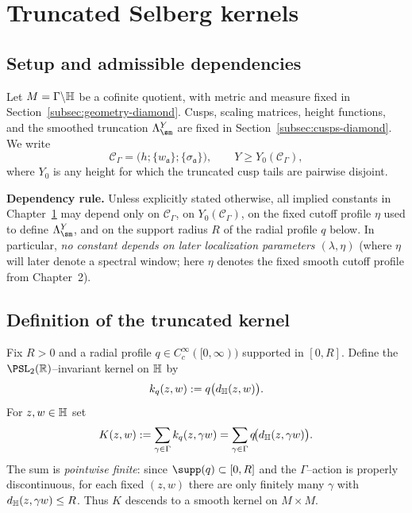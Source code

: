
\section{Truncated Selberg kernels}\label{sec:truncated-kernels}

\subsection{Setup and admissible dependencies}\label{subsec:ch3-setup}

Let $M=\Gamma\backslash\mathbb{H}$ be a cofinite quotient, with metric and measure fixed in
Section~\ref{subsec:geometry-diamond}. Cusps, scaling matrices, height functions, and the
smoothed truncation $\Lambda_{\sm}^Y$ are fixed in
Section~\ref{subsec:cusps-diamond}. We write
\[
\mathscr C_\Gamma=\bigl(h;\{w_{\mathfrak a}\};\{\sigma_{\mathfrak a}\}\bigr),\qquad
Y\ge Y_0(\mathscr C_\Gamma),
\]
where $Y_0$ is any height for which the truncated cusp tails are pairwise disjoint.

\medskip
\noindent\textbf{Dependency rule.}
Unless explicitly stated otherwise, all implied constants in Chapter~\ref{sec:truncated-kernels} may depend
only on $\mathscr C_\Gamma$, on $Y_0(\mathscr C_\Gamma)$, on the fixed cutoff profile $\eta$ used to define
$\Lambda_{\sm}^Y$, and on the support radius $R$ of the radial profile $q$ below.
In particular, \emph{no constant depends on later localization parameters $(\lambda,\eta)$} (where $\eta$
will later denote a spectral window; here $\eta$ denotes the fixed smooth cutoff profile from Chapter~2).

\subsection{Definition of the truncated kernel}\label{subsec:block3.1}

Fix $R>0$ and a radial profile $q\in C_c^\infty([0,\infty))$ supported in $[0,R]$.
Define the $\PSL_2(\R)$--invariant kernel on $\mathbb{H}$ by
\[
k_q(z,w):=q\bigl(d_{\mathbb{H}}(z,w)\bigr).
\]
For $z,w\in\mathbb{H}$ set
\begin{equation}\label{eq:K-def}
K(z,w):=\sum_{\gamma\in\Gamma} k_q(z,\gamma w)
       =\sum_{\gamma\in\Gamma} q\!\bigl(d_{\mathbb{H}}(z,\gamma w)\bigr).
\end{equation}
The sum is \emph{pointwise finite}: since $\supp(q)\subset[0,R]$ and the $\Gamma$--action is properly discontinuous,
for each fixed $(z,w)$ there are only finitely many $\gamma$ with $d_{\mathbb{H}}(z,\gamma w)\le R$.
Thus $K$ descends to a smooth kernel on $M\times M$.

